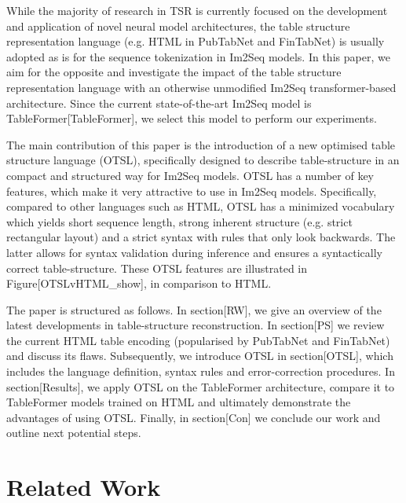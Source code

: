 \documentclass[11pt,a4paper]{article}
\begin{document}
While the majority of research in TSR is currently focused on the development and application of novel neural model architectures, the table structure representation language (e.g. HTML in PubTabNet and FinTabNet) is usually adopted as is for the sequence tokenization in Im2Seq models. In this paper, we aim for the opposite and investigate the impact of the table structure representation language with an otherwise unmodified Im2Seq transformer-based architecture. Since the current state-of-the-art Im2Seq model is TableFormer[TableFormer], we select this model to perform our experiments.

The main contribution of this paper is the introduction of a new optimised table structure language (OTSL), specifically designed to describe table-structure in an compact and structured way for Im2Seq models. OTSL has a number of key features, which make it very attractive to use in Im2Seq models. Specifically, compared to other languages such as HTML, OTSL has a minimized vocabulary which yields short sequence length, strong inherent structure (e.g. strict rectangular layout) and a strict syntax with rules that only look backwards. The latter allows for syntax validation during inference and ensures a syntactically correct table-structure. These OTSL features are illustrated in Figure[OTSLvHTML\_show], in comparison to HTML.

The paper is structured as follows. In section[RW], we give an overview of the latest developments in table-structure reconstruction. In section[PS] we review the current HTML table encoding (popularised by PubTabNet and FinTabNet) and discuss its flaws. Subsequently, we introduce OTSL in section[OTSL], which includes the language definition, syntax rules and error-correction procedures. In section[Results], we apply OTSL on the TableFormer architecture, compare it to TableFormer models trained on HTML and ultimately demonstrate the advantages of using OTSL. Finally, in section[Con] we conclude our work and outline next potential steps.

\section{Related Work}
\end{document}
